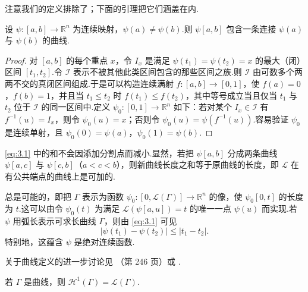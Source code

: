 注意我们的定义排除了；下面的引理把它们涵盖在内.

\begin{lemma}\label{lem:3.1}
设 $\psi:[a,b]\to\mathbb{R}^n$ 为连续映射，$\psi(a)\neq\psi(b)$.则 $\psi[a,b]$ 包含一条连接 $\psi(a)$ 与 $\psi(b)$ 的曲线.
\end{lemma}

\begin{proof}
对 $[a,b]$ 的每个重点 $x$，令 $I_x$ 是满足 $\psi(t_1)=\psi(t_2)=x$ 的最大（闭）区间 $[t_1,t_2]$.令 $\mathcal{I}$ 表示不被其他此类区间包含的那些区间之族.则 $\mathcal{I}$ 由可数多个两两不交的真闭区间组成.于是可以构造连续满射 $f:[a,b]\to[0,1]$，使 $f(a)=0$，$f(b)=1$，并且当 $t_1\leq t_2$ 时 $f(t_1)\leq f(t_2)$，其中等号成立当且仅当 $t_1$ 与 $t_2$ 位于 $\mathcal{I}$ 的同一区间中.定义 $\psi_0:[0,1]\to\mathbb{R}^n$ 如下：若对某个 $I_x\in\mathcal{I}$ 有 $f^{-1}(u)=I_x$，则令 $\psi_0(u)=x$；否则令 $\psi_0(u)=\psi(f^{-1}(u))$.容易验证 $\psi_0$ 是连续单射，且 $\psi_0(0)=\psi(a)$，$\psi_0(1)=\psi(b)$.
\end{proof}

\eqref{eq:3.1} 中的和不会因添加分割点而减小.显然，若把 $\psi[a,b]$ 分成两条曲线 $\psi[a,c]$ 与 $\psi[c,b]$（$a<c<b$），则新曲线长度之和等于原曲线的长度，即 $\mathscr{L}$ 在有公共端点的曲线上是可加的.

总是可能的，即把 $\Gamma$ 表示为函数 $\psi_0:[0,\mathscr{L}(\Gamma)]\to\mathbb{R}^n$ 的像，使 $\psi_0[0,t]$ 的长度为 $t$.这可以由令 $\psi_0(t)$ 为满足 $\mathscr{L}(\psi[a,u])=t$ 的唯一一点 $\psi(u)$ 而实现.若 $\psi$ 用弧长表示可求长曲线 $\Gamma$，则由 \eqref{eq:3.1} 可见
\begin{equation}\label{eq:3.2}
  |\psi(t_1)-\psi(t_2)|\leq|t_1-t_2|.
\end{equation}
特别地，这蕴含 $\psi$ 是绝对连续函数.

关于曲线定义的进一步讨论见 \textcite{burkillburkill1970}（第 246 页）或 \textcite{pelling1977}.

\begin{lemma}\label{lem:3.2}
若 $\Gamma$ 是曲线，则 $\mathcal{H}^1(\Gamma)=\mathscr{L}(\Gamma)$.
\end{lemma}

